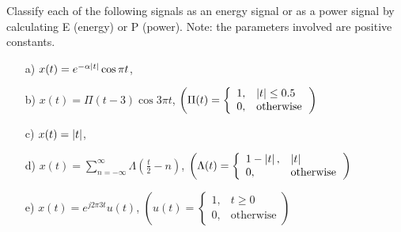 \documentclass{assignment}
\begin{document}
\begin{prob}[15 pts]
    Classify each of the following signals as an energy signal or as a power signal by calculating E (energy) or P (power). Note: the parameters involved are positive constants.
    \begin{itemize}
        \item[a)] $x(t)=e^{-\alpha\left\lvert t\right\rvert}\cos\pi t$,
        \item[b)] $x(t)=\Pi(t-3)\cos 3\pi t$, $\left(\Pi(t)=\left\{\begin{array}{ll}1,&\left\lvert t\right\rvert\leq 0.5\\0,&\text{otherwise}\end{array}\right.\right)$
        \item[c)] $x(t)=\left\lvert t\right\rvert$,
        \item[d)] $x(t)=\sum_{n=-\infty}^{\infty}\Lambda(\frac{t}{2}-n)$, $\left(\Lambda(t)=\left\{\begin{array}{ll}1-\left\lvert t\right\rvert,&\left\lvert t\right\rvert\\0,&\text{otherwise}\end{array}\right.\right)$
        \item[e)] $x(t)=e^{j2\pi 3t}u(t)$, $\left(u(t)=\left\{\begin{array}{ll}1,&t\geq 0\\0,&\text{otherwise}\end{array}\right.\right)$
    \end{itemize}
\end{prob}
\end{document}
